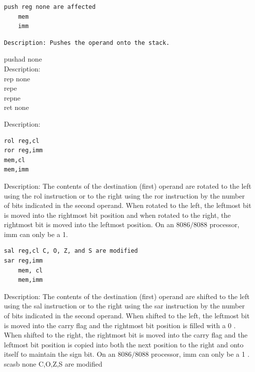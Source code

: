 \documentclass[10pt]{book}
\begin{document}
\begin{verbatim}
push reg none are affected
    mem
    imm
\end{verbatim}

\begin{verbatim}
Description: Pushes the operand onto the stack.
\end{verbatim}

pushad none\\
Description:\\
rep none\\
repe\\
repne\\
ret none

Description:

\begin{verbatim}
rol reg,cl
ror reg,imm
mem,cl
mem,imm
\end{verbatim}

Description: The contents of the destination (first) operand are rotated to the left using the rol instruction or to the right using the ror instruction by the number of bits indicated in the second operand. When rotated to the left, the leftmost bit is moved into the rightmost bit position and when rotated to the right, the rightmost bit is moved into the leftmost position. On an $8086 / 8088$ processor, imm can only be a 1.

\begin{verbatim}
sal reg,cl C, O, Z, and S are modified
sar reg,imm
    mem, cl
    mem,imm
\end{verbatim}

Description: The contents of the destination (first) operand are shifted to the left using the sal instruction or to the right using the sar instruction by the number of bits indicated in the second operand. When shifted to the left, the leftmost bit is moved into the carry flag and the rightmost bit position is filled with a 0 . When shifted to the right, the rightmost bit is moved into the carry flag and the leftmost bit position is copied into both the next position to the right and onto itself to maintain the sign bit. On an $8086 / 8088$ processor, imm can only be a 1 .\\
scasb none C,O,Z,S are modified
\end{document}
